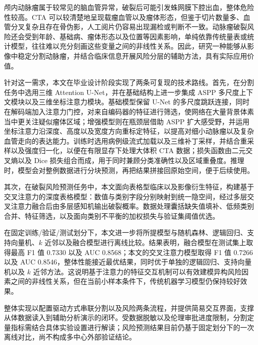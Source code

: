 颅内动脉瘤属于较常见的脑血管异常，破裂后可能引发蛛网膜下腔出血，整体危险性较高。CTA 可以较清楚地呈现载瘤血管以及瘤体形态，但鉴于切片数量多、血管分叉复杂且存在骨伪影，人工阅片仍容易出现漏检或判断不一致。动脉瘤破裂风险还会受到年龄、基础病、瘤体形态以及位置等因素影响，单纯依靠传统量表或统计模型，往往难以充分刻画这些变量之间的非线性关系。因此，研究一种能够从影像中稳定分割动脉瘤，并结合临床信息开展风险分层的辅助方法，具有实际应用价值。\par

针对这一需求，本文在毕业设计阶段实现了两条可复现的技术路线。首先，在分割任务中选用三维 Attention U-Net，并在基础结构上进一步集成 ASPP 多尺度上下文模块以及三维坐标注意力模块。基础模型保留 U-Net 的多尺度跳跃连接，同时在解码端加入注意力门控，对来自编码器的特征进行筛选，使网络在大量背景体素当中更关注疑似瘤体区域；增强模型则在瓶颈层借助 ASPP 扩大感受野，并运用坐标注意力沿深度、高度以及宽度方向重标定特征，以提高对细小动脉瘤以及复杂血管走向的表达能力。训练时选用病例级流式加载以及三维补丁采样，并结合重采样以及强度归一化，以便在有限显存下处理大体积 CTA 数据；损失函数由二元交叉熵以及 Dice 损失组合而成，用于同时兼顾分类准确性以及区域重叠度。推理时，模型会对整例数据进行分块预测，再把结果拼接回原始空间，便于后续使用。\par

其次，在破裂风险预测任务中，本文面向表格型临床以及影像衍生特征，构建基于交叉注意力的深度表格模型：数值与类别字段分别映射到统一隐空间，经过多层交叉注意力融合后由多层感知机输出破裂概率。数据处理囊括缺失值填补、低频类别合并、特征筛选，以及面向类别不平衡的加权损失与验证集阈值优选。\par

在固定训练/验证/测试划分下，本文进一步将所提模型与随机森林、逻辑回归、支持向量机、$k$ 近邻以及融合模型进行离线比较。结果表明，融合模型在测试集上取得最高 F1 值 0.7330 以及 AUC 0.8568；本文的交叉注意力模型取得 F1 值 0.7266 以及 AUC 0.8546，整体性能接近最优结果，同时优于单独的逻辑回归、支持向量机以及 $k$ 近邻方法。这说明基于注意力的特征交互机制可以有效建模异构风险因素之间的非线性关系，但在当前小样本条件下，传统机器学习模型仍保持较好效果。\par

整体实现以配置驱动方式串联分割以及风险两条流程，并提供简易交互界面，支撑从体数据读入到辅助分析演示的闭环。受数据脱敏以及伦理审批进度限制，分割定量指标需结合具体实验设置进行解读；风险预测结果目前仍基于固定划分下的一次离线对比，尚不构成多中心外部验证结论。\par
